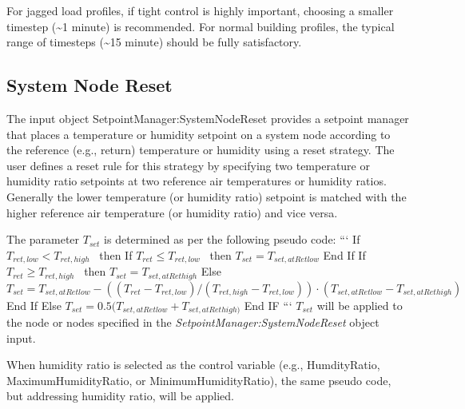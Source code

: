 For jagged load profiles, if tight control is highly important, choosing a smaller timestep (\textasciitilde{}1 minute) is recommended. For normal building profiles, the typical range of timesteps (\textasciitilde{}15 minute) should be fully satisfactory.

\subsection{System Node Reset}\label{system-node-reset}

The input object SetpointManager:SystemNodeReset provides a setpoint manager that places a temperature or humidity setpoint on a system node according to the reference (e.g., return) temperature or humidity using a reset strategy. The user defines a reset rule for this strategy by specifying two temperature or humidity ratio setpoints at two reference air temperatures or humidity ratios. Generally the lower temperature (or humidity ratio) setpoint is matched with the higher reference air temperature (or humidity ratio) and vice versa.

The parameter \(T_{set}\) is determined as per the following pseudo code:
```
If \({T_{ret,low}} < {T_{ret,high}}\) ~then
     If \({T_{ret}} \le {T_{ret,low}}\) ~then
          \({T_{set}} = {T_{set,atRetlow}}\)
     End If
     If \({T_{ret}} \ge {T_{ret,high}}\) ~then
          \({T_{set}} = {T_{set,atRethigh}}\)
     Else
          \({T_{set}} = {T_{set,atRetlow}} - (({T_{ret}} - {T_{ret,low}})/({T_{ret,high}} - {T_{ret,low}}))\cdot ({T_{set,atRetlow}} - {T_{set,atRethigh}})\)
     End If
Else
     \({T_{set}} = 0.5({T_{set,atRetlow}} + {T_{set,atRethigh)}}\)
End IF
```
\emph{\({T_{set}}\)} will be applied to the node or nodes specified in the \emph{SetpointManager:SystemNodeReset} object input.

When humidity ratio is selected as the control variable (e.g., HumdityRatio, MaximumHumidityRatio, or MinimumHumidityRatio), the same pseudo code, but addressing humidity ratio, will be applied.
